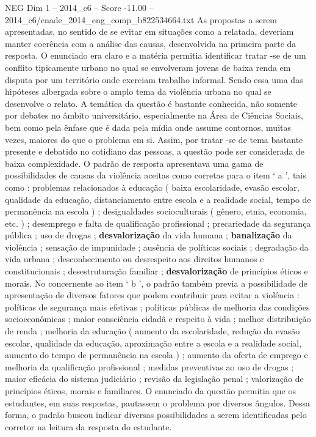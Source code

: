 \begin{textsample}{NEG Dim 1 – 2014\_c6 – Score -11.00 – 2014\_c6/enade\_2014\_eng\_comp\_b822534664.txt}
As propostas a serem apresentadas, no sentido de se evitar em situações como a relatada, deveriam manter coerência com a análise das causas, desenvolvida na primeira parte da resposta.
O enunciado era claro e a matéria permitia identificar tratar -se de um conflito tipicamente urbano no qual se envolveram jovens de baixa renda em disputa por um território onde exerciam trabalho informal.
Sendo essa uma das hipóteses albergada sobre o amplo tema da violência urbana no qual se desenvolve o relato.
A temática da questão é bastante conhecida, não somente por debates no âmbito universitário, especialmente na Área de Ciências Sociais, bem como pela ênfase que é dada pela mídia onde assume contornos, muitas vezes, maiores do que o problema em si.
Assim, por tratar -se de tema bastante presente e debatido no cotidiano das pessoas, a questão pode ser considerada de baixa complexidade.
O padrão de resposta apresentava uma gama de possibilidades de causas da violência aceitas como corretas para o item ‘ a ’, tais como : problemas relacionados à educação ( baixa escolaridade, evasão escolar, qualidade da educação, distanciamento entre escola e a realidade social, tempo de permanência na escola ) ; desigualdades socioculturais ( gênero, etnia, economia, etc. ) ; desemprego e falta de qualificação profissional ; precariedade da segurança pública ; uso de drogas ; \textbf{desvalorização} da vida humana ; \textbf{banalização} da violência ; sensação de impunidade ; ausência de políticas sociais ; degradação da vida urbana ; desconhecimento ou desrespeito aos direitos humanos e constitucionais ; desestruturação familiar ; \textbf{desvalorização} de princípios éticos e morais.
No concernente ao item ‘ b ’, o padrão também previa a possibilidade de apresentação de diversos fatores que podem contribuir para evitar a violência : políticas de segurança mais efetivas ; políticas públicas de melhoria das condições socioeconômicas ; maior consciência cidadã e respeito à vida ; melhor distribuição de renda ; melhoria da educação ( aumento da escolaridade, redução da evasão escolar, qualidade da educação, aproximação entre a escola e a realidade social, aumento do tempo de permanência na escola ) ; aumento da oferta de emprego e melhoria da qualificação profissional ; medidas preventivas ao uso de drogas ; maior eficácia do sistema judiciário ; revisão da legislação penal ; valorização de princípios éticos, morais e familiares.
O enunciado da questão permitia que os estudantes, em suas respostas, pautassem o problema por diversos ângulos.
Dessa forma, o padrão buscou indicar diversas possibilidades a serem identificadas pelo corretor na leitura da resposta do estudante.

\end{textsample}
